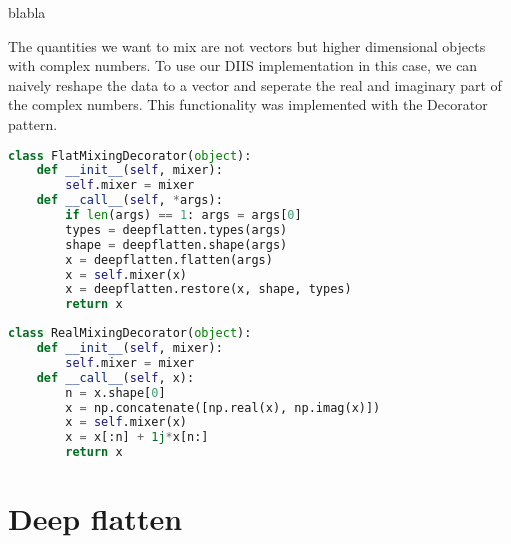 blabla

The quantities we want to mix are not vectors but higher dimensional objects with complex numbers. To use our DIIS implementation in this case, we can naively reshape the data to a vector and seperate the real and imaginary part of the complex numbers. This functionality was implemented with the Decorator pattern.

\begin{lstlisting}[label=lst:flatdec, language=python, caption=Flat mixing decorator]
class FlatMixingDecorator(object):
    def __init__(self, mixer):
        self.mixer = mixer
    def __call__(self, *args):
        if len(args) == 1: args = args[0]
        types = deepflatten.types(args)
        shape = deepflatten.shape(args)
        x = deepflatten.flatten(args)
        x = self.mixer(x)
        x = deepflatten.restore(x, shape, types)
        return x
\end{lstlisting}

\begin{lstlisting}[label=lst:realdec, language=python, caption=Real mixing decorator]
class RealMixingDecorator(object):
    def __init__(self, mixer):
        self.mixer = mixer
    def __call__(self, x):
        n = x.shape[0]
        x = np.concatenate([np.real(x), np.imag(x)])
        x = self.mixer(x)
        x = x[:n] + 1j*x[n:]
        return x
\end{lstlisting}

\section{Deep flatten}

